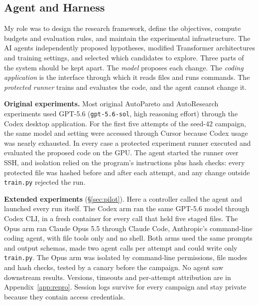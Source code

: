 \documentclass{article}
\newif\ifshowhumanmarkers \showhumanmarkersfalse
\newcommand{\humantag}[1]{{\color{humanframe}\sffamily\scriptsize\bfseries HUMAN AUTHOR MUST REWRITE/VERIFY [#1]}\ }
\newcommand{\humanauthor}[2][]{\ifshowhumanmarkers\begin{humanbox}\humantag{#1}#2\end{humanbox}\else #2\par\fi}
\begin{document}
\subsection{Agent and Harness}\label{sec:agent}
\humanauthor[P2-02 r6]{My role was to design the research framework, define the objectives, compute budgets and evaluation rules, and maintain the experimental infrastructure. The AI agents independently proposed hypotheses, modified Transformer architectures and training settings, and selected which candidates to explore. Three parts of the system should be kept apart. The \emph{model} proposes each change. The \emph{coding application} is the interface through which it reads files and runs commands. The \emph{protected runner} trains and evaluates the code, and the agent cannot change it.

\textbf{Original experiments.} Most original AutoPareto and AutoResearch experiments used GPT-5.6 (\texttt{gpt-5.6-sol}, high reasoning effort) through the Codex desktop application. For the first five attempts of the seed-42 campaign, the same model and setting were accessed through Cursor because Codex usage was nearly exhausted. In every case a protected experiment runner executed and evaluated the proposed code on the GPU. The agent started the runner over SSH, and isolation relied on the program's instructions plus hash checks: every protected file was hashed before and after each attempt, and any change outside \texttt{train.py} rejected the run.

\textbf{Extended experiments} (\S\ref{sec:pilot}). Here a controller called the agent and launched every run itself. The Codex arm ran the same GPT-5.6 model through Codex CLI, in a fresh container for every call that held five staged files. The Opus arm ran Claude Opus 5.5 through Claude Code, Anthropic's command-line coding agent, with file tools only and no shell. Both arms used the same prompts and output schemas, made two agent calls per attempt and could write only \texttt{train.py}. The Opus arm was isolated by command-line permissions, file modes and hash checks, tested by a canary before the campaign. No agent saw downstream results. Versions, timeouts and per-attempt attribution are in Appendix~\ref{app:repro}. Session logs survive for every campaign and stay private because they contain access credentials.}
\end{document}
